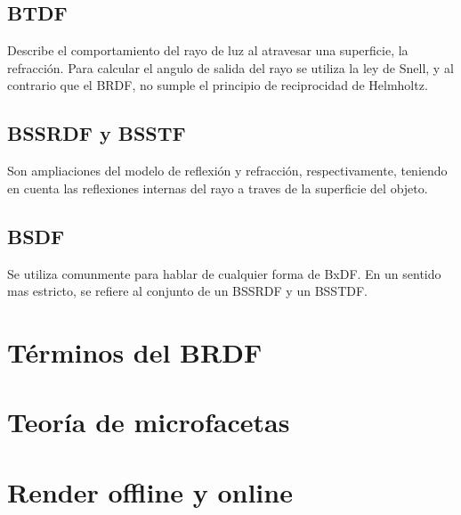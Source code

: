     \subsection{BTDF}
        Describe el comportamiento del rayo de luz al atravesar una superficie, la refracci\'on. Para calcular el angulo de salida del rayo se utiliza la
        ley de Snell, y al contrario que el BRDF, no sumple el principio de reciprocidad de Helmholtz.

    \subsection{BSSRDF y BSSTF}
        Son ampliaciones del modelo de reflexi\'on y refracci\'on, respectivamente, teniendo en cuenta las reflexiones internas del rayo a traves de la
        superficie del objeto.

    \subsection{BSDF}
        Se utiliza comunmente para hablar de cualquier forma de BxDF. En un sentido mas estricto, se refiere al conjunto de un BSSRDF y un BSSTDF.

\section{T\'erminos del BRDF}

\section{Teor\'ia de microfacetas}

\section{Render offline y online}
